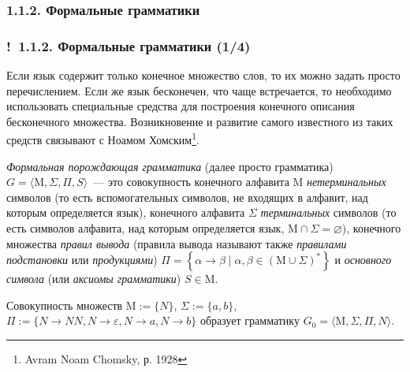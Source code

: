 \documentclass[mathserif,12pt,aspectratio=169]{beamer}
\renewcommand{\index}[1]{}
\def\odmkey#1#2{{\it\color{red} #1}\index{#2}}
\let\emptyset\varnothing
\def\Set#1#2{\left\{ #1 \mid #2 \right\}}
\def\Assign{\operatorname{:=}}
\def\Ok{{\color{green}\textbf{!}\ }}
\begin{document}
\subsubsection{1.1.2. Формальные грамматики}\label{1.1.2.}
\begin{frame}
\frametitle{\Ok 1.1.2. Формальные грамматики (1/4)}

Если язык содержит только конечное множество
слов, то их можно задать просто перечислением.
Если же язык бесконечен, что чаще встречается,
то необходимо использовать специальные средства
для построения конечного описания бесконечного множества.
Возникновение и развитие самого известного из таких средств 
связывают с Ноамом Хомским\footnote{Avram Noam Chomsky, р. 1928}.
  
\smallskip 
\odmkey{Формальная порождающая грамматика}{Грамматика!формальная}
\odmkey{}{Грамматика!порождающая} (далее просто грамматика)
$G=\langle \mathrm{M}, \Sigma, \Pi, S\rangle$~--- это совокупность конечного
алфавита $\mathrm{M}$ \odmkey{нетерминальных}{Символ!нетерминальный}
символов (то есть вспомогательных символов, не входящих в алфавит, над которым определяется язык), конечного алфавита $\Sigma$
\odmkey{терминальных}{Символ!терминальный} символов (то есть  символов алфавита, над которым определяется язык, 
$\mathrm{M}\cap \Sigma = \emptyset$), конечного множества \odmkey{правил вывода}{Правило!вывода}
(правила вывода называют также \odmkey{правилами подстановки}{Правило!подстановки}
или \odmkey{продукциями}{Продукция})
$\Pi=\Set{\alpha\rightarrow\beta}{\alpha,\beta\in (\mathrm{M}\cup \Sigma)^*}$ и
\odmkey{основного символа}{Символ!основной} (или \odmkey{аксиомы
грамматики}{Аксиома!грамматики}) $S \in \mathrm{M}$.


\begin{example}
Совокупность множеств 
$\mathrm{M}\Assign \{N\}$,
$\Sigma\Assign\{a,b\}$, \\
$\Pi\Assign\{N\to NN, N\to \varepsilon, N\to a,
N\to b\}$  образует грамматику  
$G_0=\langle \mathrm{M},\Sigma, \Pi, N\rangle$.
\end{example}

\end{frame}
\end{document}
